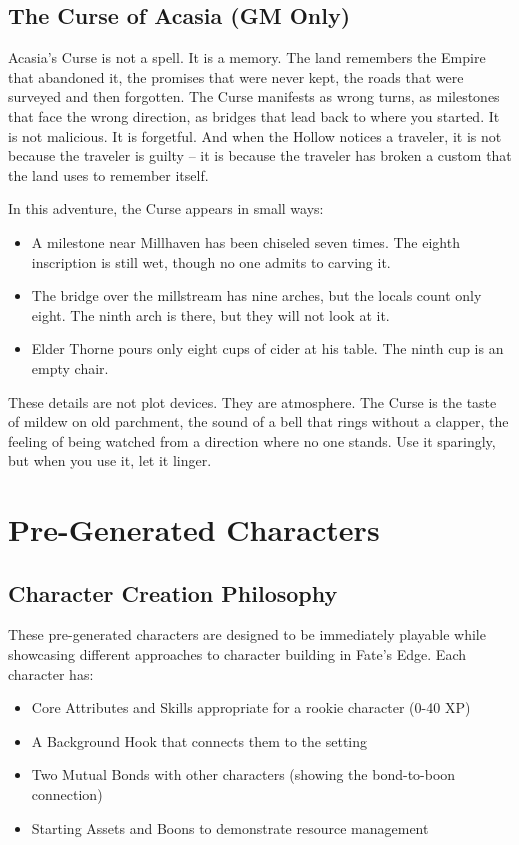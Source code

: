 \documentclass[11pt]{article}
\begin{document}
\subsection{The Curse of Acasia (GM Only)}

Acasia's Curse is not a spell. It is a memory. The land remembers the Empire that abandoned it, the promises that were never kept, the roads that were surveyed and then forgotten. The Curse manifests as wrong turns, as milestones that face the wrong direction, as bridges that lead back to where you started. It is not malicious. It is forgetful. And when the Hollow notices a traveler, it is not because the traveler is guilty -- it is because the traveler has broken a custom that the land uses to remember itself.

In this adventure, the Curse appears in small ways:
\begin{itemize}
\item A milestone near Millhaven has been chiseled seven times. The eighth inscription is still wet, though no one admits to carving it.
\item The bridge over the millstream has nine arches, but the locals count only eight. The ninth arch is there, but they will not look at it.
\item Elder Thorne pours only eight cups of cider at his table. The ninth cup is an empty chair.
\end{itemize}

These details are not plot devices. They are atmosphere. The Curse is the taste of mildew on old parchment, the sound of a bell that rings without a clapper, the feeling of being watched from a direction where no one stands. Use it sparingly, but when you use it, let it linger.

\section{Pre-Generated Characters}

\subsection{Character Creation Philosophy}

These pre-generated characters are designed to be immediately playable while showcasing different approaches to character building in Fate's Edge. Each character has:
\begin{itemize}
\item Core Attributes and Skills appropriate for a rookie character (0-40 XP)
\item A Background Hook that connects them to the setting
\item Two Mutual Bonds with other characters (showing the bond-to-boon connection)
\item Starting Assets and Boons to demonstrate resource management
\end{itemize}
\end{document}

